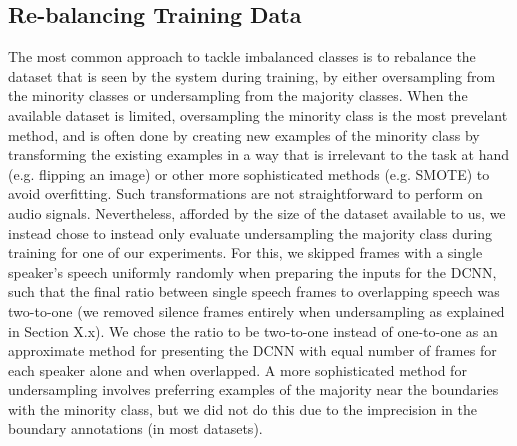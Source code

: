 \documentclass[a4paper]{article}
\begin{document}
\subsection{Re-balancing Training Data}
The most common approach to tackle imbalanced classes is to rebalance the dataset that is seen by the system during training,
by either oversampling from the minority classes or undersampling from the majority classes.
When the available dataset is limited, oversampling the minority class is the most prevelant method,
and is often done by creating new examples of the minority class by transforming the existing examples in a way that is irrelevant to the task at hand (e.g. flipping an image) or other more sophisticated methods (e.g. SMOTE) to avoid overfitting.  %
Such transformations are not straightforward to perform on audio signals.
Nevertheless, afforded by the size of the dataset available to us,
we instead chose to instead only evaluate undersampling the majority class during training for one of our experiments.
For this, we skipped frames with a single speaker's speech uniformly randomly when preparing the inputs for the DCNN,
such that the final ratio between single speech frames to overlapping speech was two-to-one
(we removed silence frames entirely when undersampling as explained in Section X.x).  %
We chose the ratio to be two-to-one instead of one-to-one as an approximate method for presenting the DCNN with equal number of frames for each speaker alone and when overlapped.
A more sophisticated method for undersampling involves preferring examples of the majority near the boundaries with the minority class,
but we did not do this due to the imprecision in the boundary annotations (in most datasets).

\end{document}
